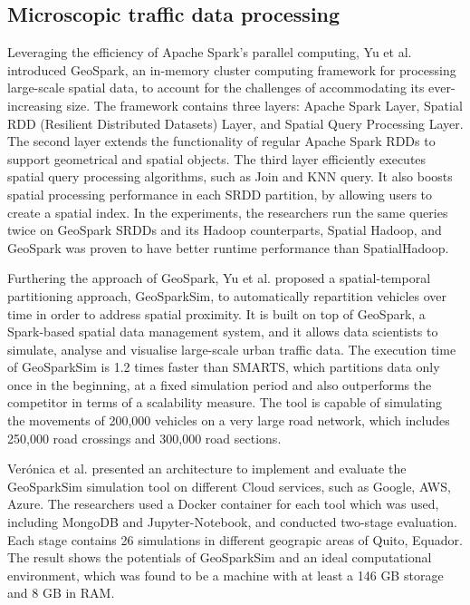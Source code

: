 \documentclass[11pt]{uonthesis}
\begin{document}
\subsection{Microscopic traffic data processing}
Leveraging the efficiency of Apache Spark's parallel computing, Yu et al.\cite{10.1145/2820783.2820860} introduced GeoSpark, an in-memory cluster computing framework for processing large-scale spatial data, to account for the challenges of accommodating its ever-increasing size. The framework contains three layers: Apache Spark Layer, Spatial RDD (Resilient Distributed Datasets) Layer, and Spatial Query Processing Layer. The second layer extends the functionality of regular Apache Spark RDDs to support geometrical and spatial objects. The third layer efficiently executes spatial query processing algorithms, such as Join and KNN query. It also boosts spatial processing performance in each SRDD partition, by allowing users to create a spatial index. In the experiments, the researchers run the same queries twice on GeoSpark SRDDs and its Hadoop counterparts, Spatial Hadoop, and GeoSpark was proven to have better runtime performance than SpatialHadoop.

Furthering the approach of GeoSpark, Yu et al.\cite{yu2020dissecting} proposed a spatial-temporal partitioning approach, GeoSparkSim, to automatically repartition vehicles over time in order to address spatial proximity. It is built on top of GeoSpark, a Spark-based spatial data management system, and it allows data scientists to simulate, analyse and visualise large-scale urban traffic data. The execution time of GeoSparkSim is 1.2 times faster than SMARTS, which partitions data only once in the beginning, at a fixed simulation period and also outperforms the competitor in terms of a scalability measure. The tool is capable of simulating the movements of 200,000 vehicles on a very large road network, which includes 250,000 road crossings and 300,000 road sections. 

Verónica et al.\cite{10.1007/978-981-16-4126-8_24} presented an architecture to implement and evaluate the GeoSparkSim simulation tool on different Cloud services, such as Google, AWS, Azure. The researchers used a Docker container for each tool which was used, including MongoDB and Jupyter-Notebook, and conducted two-stage evaluation. Each stage contains 26 simulations in different geograpic areas of Quito, Equador. The result shows the potentials of GeoSparkSim and an ideal computational environment, which was found to be a machine with at least a 146 GB storage and 8 GB in RAM. 
\end{document}
